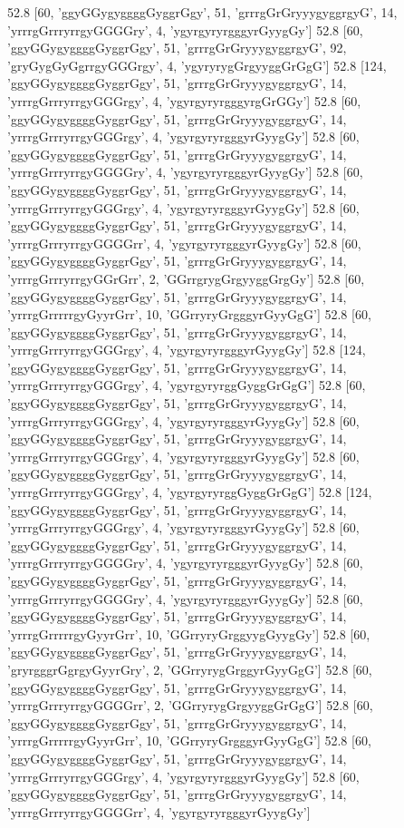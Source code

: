 52.8 [60, 'ggyGGygyggggGyggrGgy', 51, 'grrrgGrGryyygyggrgyG', 14, 'yrrrgGrrryrrgyGGGGry', 4, 'ygyrgyryrgggyrGyygGy']
52.8 [60, 'ggyGGygyggggGyggrGgy', 51, 'grrrgGrGryyygyggrgyG', 92, 'gryGygGyGgrrgyGGGrgy', 4, 'ygyryrygGrgyyggGrGgG']
52.8 [124, 'ggyGGygyggggGyggrGgy', 51, 'grrrgGrGryyygyggrgyG', 14, 'yrrrgGrrryrrgyGGGrgy', 4, 'ygyrgyryrgggyrgGrGGy']
52.8 [60, 'ggyGGygyggggGyggrGgy', 51, 'grrrgGrGryyygyggrgyG', 14, 'yrrrgGrrryrrgyGGGrgy', 4, 'ygyrgyryrgggyrGyygGy']
52.8 [60, 'ggyGGygyggggGyggrGgy', 51, 'grrrgGrGryyygyggrgyG', 14, 'yrrrgGrrryrrgyGGGGry', 4, 'ygyrgyryrgggyrGyygGy']
52.8 [60, 'ggyGGygyggggGyggrGgy', 51, 'grrrgGrGryyygyggrgyG', 14, 'yrrrgGrrryrrgyGGGrgy', 4, 'ygyrgyryrgggyrGyygGy']
52.8 [60, 'ggyGGygyggggGyggrGgy', 51, 'grrrgGrGryyygyggrgyG', 14, 'yrrrgGrrryrrgyGGGGrr', 4, 'ygyrgyryrgggyrGyygGy']
52.8 [60, 'ggyGGygyggggGyggrGgy', 51, 'grrrgGrGryyygyggrgyG', 14, 'yrrrgGrrryrrgyGGrGrr', 2, 'GGrrgrygGrgyyggGrgGy']
52.8 [60, 'ggyGGygyggggGyggrGgy', 51, 'grrrgGrGryyygyggrgyG', 14, 'yrrrgGrrrrrgyGyyrGrr', 10, 'GGrryryGrgggyrGyyGgG']
52.8 [60, 'ggyGGygyggggGyggrGgy', 51, 'grrrgGrGryyygyggrgyG', 14, 'yrrrgGrrryrrgyGGGrgy', 4, 'ygyrgyryrgggyrGyygGy']
52.8 [124, 'ggyGGygyggggGyggrGgy', 51, 'grrrgGrGryyygyggrgyG', 14, 'yrrrgGrrryrrgyGGGrgy', 4, 'ygyrgyryrggGyggGrGgG']
52.8 [60, 'ggyGGygyggggGyggrGgy', 51, 'grrrgGrGryyygyggrgyG', 14, 'yrrrgGrrryrrgyGGGrgy', 4, 'ygyrgyryrgggyrGyygGy']
52.8 [60, 'ggyGGygyggggGyggrGgy', 51, 'grrrgGrGryyygyggrgyG', 14, 'yrrrgGrrryrrgyGGGrgy', 4, 'ygyrgyryrgggyrGyygGy']
52.8 [60, 'ggyGGygyggggGyggrGgy', 51, 'grrrgGrGryyygyggrgyG', 14, 'yrrrgGrrryrrgyGGGrgy', 4, 'ygyrgyryrggGyggGrGgG']
52.8 [124, 'ggyGGygyggggGyggrGgy', 51, 'grrrgGrGryyygyggrgyG', 14, 'yrrrgGrrryrrgyGGGrgy', 4, 'ygyrgyryrgggyrGyygGy']
52.8 [60, 'ggyGGygyggggGyggrGgy', 51, 'grrrgGrGryyygyggrgyG', 14, 'yrrrgGrrryrrgyGGGGry', 4, 'ygyrgyryrgggyrGyygGy']
52.8 [60, 'ggyGGygyggggGyggrGgy', 51, 'grrrgGrGryyygyggrgyG', 14, 'yrrrgGrrryrrgyGGGGry', 4, 'ygyrgyryrgggyrGyygGy']
52.8 [60, 'ggyGGygyggggGyggrGgy', 51, 'grrrgGrGryyygyggrgyG', 14, 'yrrrgGrrrrrgyGyyrGrr', 10, 'GGrryryGrggyygGyygGy']
52.8 [60, 'ggyGGygyggggGyggrGgy', 51, 'grrrgGrGryyygyggrgyG', 14, 'gryrgggrGgrgyGyyrGry', 2, 'GGrryrygGrggyrGyyGgG']
52.8 [60, 'ggyGGygyggggGyggrGgy', 51, 'grrrgGrGryyygyggrgyG', 14, 'yrrrgGrrryrrgyGGGGrr', 2, 'GGrryrygGrgyyggGrGgG']
52.8 [60, 'ggyGGygyggggGyggrGgy', 51, 'grrrgGrGryyygyggrgyG', 14, 'yrrrgGrrrrrgyGyyrGrr', 10, 'GGrryryGrgggyrGyyGgG']
52.8 [60, 'ggyGGygyggggGyggrGgy', 51, 'grrrgGrGryyygyggrgyG', 14, 'yrrrgGrrryrrgyGGGrgy', 4, 'ygyrgyryrgggyrGyygGy']
52.8 [60, 'ggyGGygyggggGyggrGgy', 51, 'grrrgGrGryyygyggrgyG', 14, 'yrrrgGrrryrrgyGGGGrr', 4, 'ygyrgyryrgggyrGyygGy']
